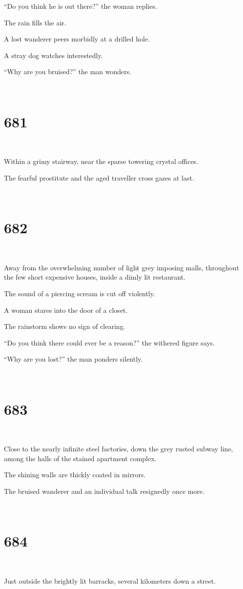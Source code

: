 \documentclass{report}
\begin{document}
``Do you think he is out there?'' the woman replies.

The rain fills the air.

A lost wanderer peers morbidly at a drilled hole.

A stray dog watches interestedly.

``Why are you bruised?'' the man wonders.

~
\chapter*{681}
~

Within a grimy stairway, near the sparse towering crystal offices.

The fearful prostitute and the aged traveller cross gazes at last.

~
\chapter*{682}
~

Away from the overwhelming number of light grey imposing malls, throughout the few short expensive houses, inside a dimly lit restaurant.

The sound of a piercing scream is cut off violently.

A woman stares into the door of a closet.

The rainstorm shows no sign of clearing.

``Do you think there could ever be a reason?'' the withered figure says.

``Why are you lost?'' the man ponders silently.

~
\chapter*{683}
~

Close to the nearly infinite steel factories, down the grey rusted subway line, among the halls of the stained apartment complex.

The shining walls are thickly coated in mirrors.

The bruised wanderer and an individual talk resignedly once more.

~
\chapter*{684}
~

Just outside the brightly lit barracks, several kilometers down a street.
\end{document}
